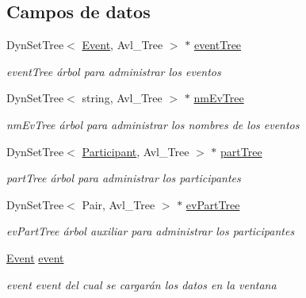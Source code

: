 \subsection*{Campos de datos}
\begin{DoxyCompactItemize}
\item 
Dyn\+Set\+Tree$<$ \hyperlink{class_event}{Event}, Avl\+\_\+\+Tree $>$ $\ast$ \hyperlink{class_people_reg_window_afaed29390f627773d8bfe05b7b5ff92d}{event\+Tree}\hypertarget{class_people_reg_window_afaed29390f627773d8bfe05b7b5ff92d}{}\label{class_people_reg_window_afaed29390f627773d8bfe05b7b5ff92d}

\begin{DoxyCompactList}\small\item\em event\+Tree árbol para administrar los eventos \end{DoxyCompactList}\item 
Dyn\+Set\+Tree$<$ string, Avl\+\_\+\+Tree $>$ $\ast$ \hyperlink{class_people_reg_window_a72bc02cd2e5b5f7b669178e79e016c48}{nm\+Ev\+Tree}\hypertarget{class_people_reg_window_a72bc02cd2e5b5f7b669178e79e016c48}{}\label{class_people_reg_window_a72bc02cd2e5b5f7b669178e79e016c48}

\begin{DoxyCompactList}\small\item\em nm\+Ev\+Tree árbol para administrar los nombres de los eventos \end{DoxyCompactList}\item 
Dyn\+Set\+Tree$<$ \hyperlink{class_participant}{Participant}, Avl\+\_\+\+Tree $>$ $\ast$ \hyperlink{class_people_reg_window_aea124c8bd37c53c79f8adc1a0904f930}{part\+Tree}\hypertarget{class_people_reg_window_aea124c8bd37c53c79f8adc1a0904f930}{}\label{class_people_reg_window_aea124c8bd37c53c79f8adc1a0904f930}

\begin{DoxyCompactList}\small\item\em part\+Tree árbol para administrar los participantes \end{DoxyCompactList}\item 
Dyn\+Set\+Tree$<$ Pair, Avl\+\_\+\+Tree $>$ $\ast$ \hyperlink{class_people_reg_window_ac07cbd1c74b56048d0e57253e2dd7680}{ev\+Part\+Tree}\hypertarget{class_people_reg_window_ac07cbd1c74b56048d0e57253e2dd7680}{}\label{class_people_reg_window_ac07cbd1c74b56048d0e57253e2dd7680}

\begin{DoxyCompactList}\small\item\em ev\+Part\+Tree árbol auxiliar para administrar los participantes \end{DoxyCompactList}\item 
\hyperlink{class_event}{Event} \hyperlink{class_people_reg_window_ac0034c7bafd1c6cfc002006c29f23e46}{event}\hypertarget{class_people_reg_window_ac0034c7bafd1c6cfc002006c29f23e46}{}\label{class_people_reg_window_ac0034c7bafd1c6cfc002006c29f23e46}

\begin{DoxyCompactList}\small\item\em event event del cual se cargarán los datos en la ventana \end{DoxyCompactList}\end{DoxyCompactItemize}


